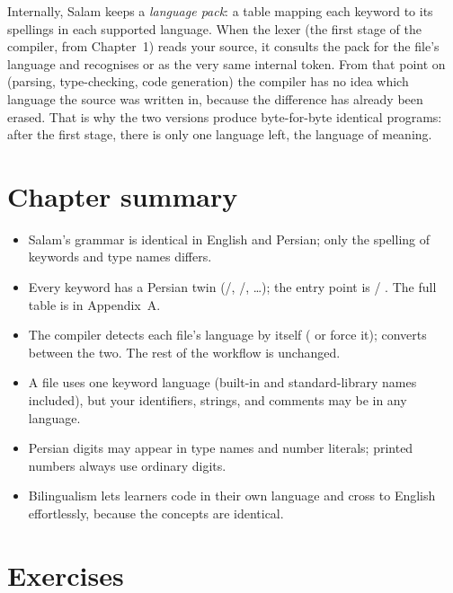 \begin{deep}
Internally, Salam keeps a \emph{language pack}: a table mapping each keyword to its
spellings in each supported language. When the lexer (the first stage of the
compiler, from Chapter~1) reads your source, it consults the pack for the file's
language and recognises  or  as the very same
internal token. From that point on (parsing, type-checking, code
generation) the compiler has no idea which language the source was written in,
because the difference has already been erased. That is why the two versions
produce byte-for-byte identical programs: after the first stage, there is only one
language left, the language of meaning.
\end{deep}

\section{Chapter summary}

\begin{itemize}[leftmargin=1.4em]
  \item Salam's grammar is identical in English and Persian; only the spelling of
        keywords and type names differs.
  \item Every keyword has a Persian twin (/,
        /, \dots); the entry point is  /
        . The full table is in Appendix~A.
  \item The compiler detects each file's language by itself (
        or  force it);  converts between
        the two. The rest of the workflow is unchanged.
  \item A file uses one keyword language (built-in and standard-library names
        included), but your identifiers, strings, and comments may be in any
        language.
  \item Persian digits may appear in type names and number literals; printed
        numbers always use ordinary digits.
  \item Bilingualism lets learners code in their own language and cross to English
        effortlessly, because the concepts are identical.
\end{itemize}

\section{Exercises}

